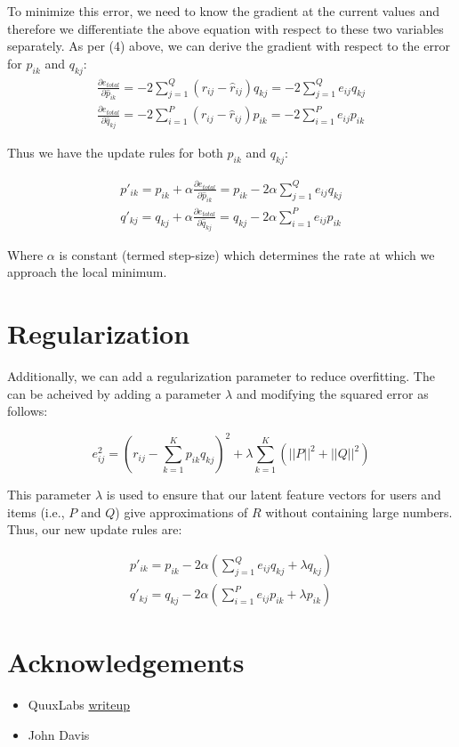 \documentclass[12pt,reqno]{article}
\begin{document}
To minimize this error, we need to know the gradient at the current values and
therefore we differentiate the above equation with respect to these two
variables separately. As per (4) above, we can derive the gradient with respect
to the error for $p_{ik}$ and $q_{kj}$:
\begin{align}
  \frac{\partial e_{total}}{\partial \hat{p}_{ik}} = -2\sum_{j=1}^{Q}(r_{ij} - 
\hat{r}_{ij})q_{kj} = -2\sum_{j=1}^{Q}e_{ij}q_{kj} \\
  \frac{\partial e_{total}}{\partial \hat{q}_{kj}} = -2\sum_{i=1}^{P}(r_{ij} - 
\hat{r}_{ij})p_{ik} = -2\sum_{i=1}^{P}e_{ij}p_{ik}
\end{align}

Thus we have the update rules for both $p_{ik}$ and $q_{kj}$:

\begin{align}
  p'_{ik} = p_{ik} + \alpha\frac{\partial e_{total}}{\partial \hat{p}_{ik}}
= p_{ik} - 2\alpha\sum_{j=1}^{Q}e_{ij}q_{kj} \\
  q'_{kj} = q_{kj} + \alpha\frac{\partial e_{total}}{\partial \hat{q}_{kj}}
= q_{kj} - 2\alpha\sum_{i=1}^{P}e_{ij}p_{ik}
\end{align}

Where $\alpha$ is constant (termed step-size) which determines the rate at which
we approach the local minimum.

\section{Regularization}
Additionally, we can add a regularization parameter to reduce overfitting. The
can be acheived by adding a parameter $\lambda$ and modifying the squared error
as follows:

\begin{equation}
  e_{ij}^2 = (r_{ij} - \sum_{k=1}^{K}p_{ik} q_{kj})^2 + 
\lambda\sum_{k=1}^{K}(||P||^2 + ||Q||^2)
\end{equation}

This parameter $\lambda$ is used to ensure that our latent feature vectors for
users and items (i.e., $P$ and $Q$) give approximations of $R$ without
containing large numbers. Thus, our new update rules are:

\begin{align}
  p'_{ik} = p_{ik} - 2\alpha(\sum_{j=1}^{Q}e_{ij}q_{kj} + \lambda q_{kj}) \\
  q'_{kj} = q_{kj} - 2\alpha(\sum_{i=1}^{P}e_{ij}p_{ik} + \lambda p_{ik})
\end{align}

\section{Acknowledgements}
\begin{itemize}
\item QuuxLabs \href{http://www.quuxlabs.com/blog/2010/09/matrix-factorization-a-simple-tutorial-and-implementation-in-python/}{writeup}
\item John Davis
\end{itemize}
\end{document}
